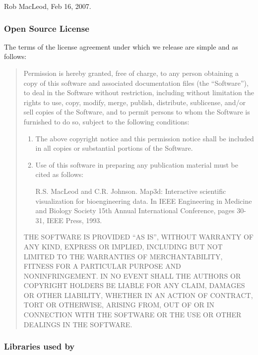 \bigskip
\noindent
Rob MacLeod, Feb 16, 2007.


\subsubsection{Open Source License}
\label{sec:source_license}

The terms of the license agreement under which we release \map{} are simple
and as follows:

\begin{quotation}

Permission is hereby granted, free of charge, to any person obtaining a
copy of this software and associated documentation files (the
``Software''), to deal in the Software without restriction, including
without limitation the rights to use, copy, modify, merge, publish,
distribute, sublicense, and/or sell copies of the Software, and to permit
persons to whom the Software is furnished to do so, subject to the
following conditions:
\begin{enumerate}
  \item The above copyright notice and this permission notice shall be
    included in all copies or substantial portions of the Software.
  \item Use of this software in preparing any publication material must be
    cited as follows:
    
    \vspace{0.1in}
    
    R.S. MacLeod and C.R. Johnson. Map3d: Interactive scientific
    visualization for bioengineering data. In IEEE Engineering in
    Medicine and Biology Society 15th Annual International Conference,
    pages 30-31, IEEE Press, 1993.
\end{enumerate}
\vspace{0.1in}

THE SOFTWARE IS PROVIDED ``AS IS'', WITHOUT WARRANTY OF ANY KIND, EXPRESS
OR IMPLIED, INCLUDING BUT NOT LIMITED TO THE WARRANTIES OF MERCHANTABILITY,
FITNESS FOR A PARTICULAR PURPOSE AND NONINFRINGEMENT. IN NO EVENT SHALL THE
AUTHORS OR COPYRIGHT HOLDERS BE LIABLE FOR ANY CLAIM, DAMAGES OR OTHER
LIABILITY, WHETHER IN AN ACTION OF CONTRACT, TORT OR OTHERWISE, ARISING
FROM, OUT OF OR IN CONNECTION WITH THE SOFTWARE OR THE USE OR OTHER
DEALINGS IN THE SOFTWARE.
\end{quotation}


\subsubsection{Libraries used by \map{}}


